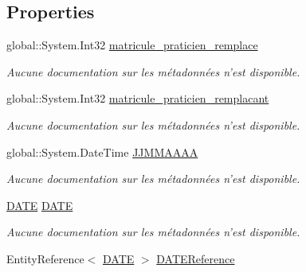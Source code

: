 \subsection*{Properties}
\begin{DoxyCompactItemize}
\item 
global\-::\-System.\-Int32 \hyperlink{class_model_1_1_r_e_m_p_l_a_c_e_ac3e241e1a97864f915ca369bd99dfde3}{matricule\-\_\-praticien\-\_\-remplace}
\begin{DoxyCompactList}\small\item\em Aucune documentation sur les métadonnées n'est disponible. \end{DoxyCompactList}\item 
global\-::\-System.\-Int32 \hyperlink{class_model_1_1_r_e_m_p_l_a_c_e_a43176ce5aac61a5dbb677d871f8f2c32}{matricule\-\_\-praticien\-\_\-remplacant}
\begin{DoxyCompactList}\small\item\em Aucune documentation sur les métadonnées n'est disponible. \end{DoxyCompactList}\item 
global\-::\-System.\-Date\-Time \hyperlink{class_model_1_1_r_e_m_p_l_a_c_e_add9e25bf7035011a33a3891f38094899}{J\-J\-M\-M\-A\-A\-A\-A}
\begin{DoxyCompactList}\small\item\em Aucune documentation sur les métadonnées n'est disponible. \end{DoxyCompactList}\item 
\hyperlink{class_model_1_1_d_a_t_e}{D\-A\-T\-E} \hyperlink{class_model_1_1_r_e_m_p_l_a_c_e_aa79608c4a3babab2a00e7d15e39a0000}{D\-A\-T\-E}
\begin{DoxyCompactList}\small\item\em Aucune documentation sur les métadonnées n'est disponible. \end{DoxyCompactList}\item 
Entity\-Reference$<$ \hyperlink{class_model_1_1_d_a_t_e}{D\-A\-T\-E} $>$ \hyperlink{class_model_1_1_r_e_m_p_l_a_c_e_abf3a8737719c75494fa54c1ffe335d39}{D\-A\-T\-E\-Reference}

\end{DoxyCompactItemize}
